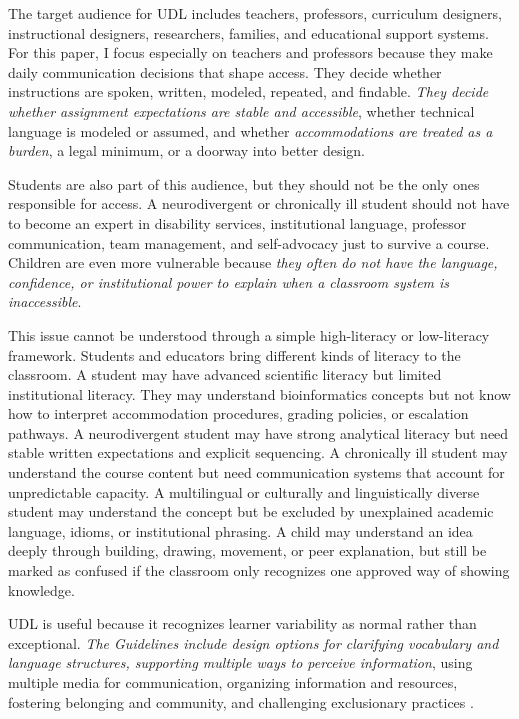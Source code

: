 The target audience for UDL includes teachers, professors, curriculum designers, instructional designers, researchers, families, and educational support systems. For this paper, I focus especially on teachers and professors because they make daily communication decisions that shape access. They decide whether instructions are spoken, written, modeled, repeated, and findable. \textit{They decide whether assignment expectations are stable and accessible}, whether technical language is modeled or assumed, and whether \textit{accommodations are treated as a burden}, a legal minimum, or a doorway into better design.

Students are also part of this audience, but they should not be the only ones responsible for access. A neurodivergent or chronically ill student should not have to become an expert in disability services, institutional language, professor communication, team management, and self-advocacy just to survive a course. Children are even more vulnerable because \textit{they often do not have the language, confidence, or institutional power to explain when a classroom system is inaccessible}.


This issue cannot be understood through a simple high-literacy or low-literacy framework. Students and educators bring different kinds of literacy to the classroom. A student may have advanced scientific literacy but limited institutional literacy. They may understand bioinformatics concepts but not know how to interpret accommodation procedures, grading policies, or escalation pathways. A neurodivergent student may have strong analytical literacy but need stable written expectations and explicit sequencing. A chronically ill student may understand the course content but need communication systems that account for unpredictable capacity. A multilingual or culturally and linguistically diverse student may understand the concept but be excluded by unexplained academic language, idioms, or institutional phrasing. A child may understand an idea deeply through building, drawing, movement, or peer explanation, but still be marked as confused if the classroom only recognizes one approved way of showing knowledge.

UDL is useful because it recognizes learner variability as normal rather than exceptional. \textit{The Guidelines include design options for clarifying vocabulary and language structures, supporting multiple ways to perceive information}, using multiple media for communication, organizing information and resources, fostering belonging and community, and challenging exclusionary practices \citep{cast2024udl}.

